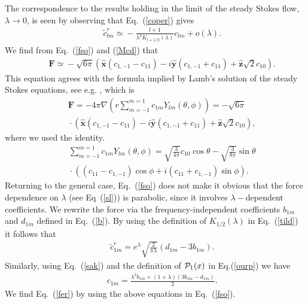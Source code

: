\documentclass[aps,prx,twocolumn,amsmath,amssymb,amsfonts]{revtex4-2}
\begin{document}
{{\begin{appendices}
The correspondence to the results holding in the limit of the steady Stokes flow, $\lambda\to 0$, is seen by observing that Eq.~(\ref{coper}) gives
\begin{eqnarray}&&
{\tilde c}^{r}_{lm} \!\simeq\!-\frac{l+1}{\lambda^2K_{l+1/2}(\lambda)}c_{lm}+o\left(\lambda\right).
\end{eqnarray}
We find from Eq.~(\ref{fso}) and (\ref{Mcd}) that
\begin{eqnarray}&&
\bm F\!\simeq \!-\sqrt{6\pi} \left(\bm{\hat x}(c_{1, -1}\!-\!c_{11})\!-\! i\bm{\hat y}(c_{1, -1}\!+\!c_{11})\!+\!\bm{\hat z}\sqrt{2}c_{10}\right).\nonumber%
\end{eqnarray}
This equation agrees with the formula implied by Lamb's solution of the steady Stokes equations, see e.g. \cite{kim,hb}, which is
\begin{eqnarray}&&\!\!\!\!\!\!\!\!\!\!\!\!
\bm F=-4\pi \nabla \left(r\sum_{m=-1}^{m=1}c_{1m}Y_{lm}(\theta, \phi)\right)=-\sqrt{6\pi} \nonumber\\&&\!\!\!\!\!\!\!\!\!\!\!\!\!
\cdot \left(\bm{\hat x}(c_{1, -1}-c_{11})\!-\! i\bm{\hat y}(c_{1, -1}+c_{11})+\bm{\hat z}\sqrt{2}c_{10}\right),
\end{eqnarray}
where we used the identity.
\begin{eqnarray}&&\!\!\!\!\!\!\!\!\!\!\!\!\!
\sum_{m=-1}^{m=1}c_{1m}Y_{lm}(\theta, \phi)=\sqrt{\frac{3}{4\pi}}c_{10}\cos\theta-\sqrt{\frac{3}{8\pi}}\sin\theta
\nonumber\\&&\!\!\!\!\!\!\!\!\!\!\!\!\!
\cdot \left((c_{11}-c_{1, -1})\cos\phi+i(c_{11}+c_{1, -1})\sin\phi\right).
\end{eqnarray}
Returning to the general case, Eq.~(\ref{fso}) does not make it obvious that the force dependence on $\lambda$ (see Eq~(\ref{sl})) is parabolic, since it involves $\lambda-$dependent coefficients. We rewrite the force via the frequency-independent coefficients $b_{1m}$ and $d_{1m}$ defined in Eq.~(\ref{b}). By using the definition of $K_{1/2}(\lambda)$ in Eq.~(\ref{tild}) it follows that
\begin{eqnarray}&&\!\!\!\!\!\!
{\tilde c}^{r}_{1m} \!= \!e^{\lambda}\sqrt{\frac{2}{\pi \lambda}}\left(d_{1m}\!-\!3b_{1m}\right). \label{rsu}
\end{eqnarray}
Similarly, using Eq.~(\ref{sak})
and the definition of $ {\cal P}_1(x)$ in Eq.(\ref{ourp}) we have
\begin{eqnarray}&&
c_{1m}\!=\!\frac{ \lambda^2 b_{1m}+(1\!+\!\lambda) \left(3b_{1m}-d_{1m}\right)}{2}.
\end{eqnarray}
We find Eq.~(\ref{fer}) by using the above equations in Eq.~(\ref{fso}).


\end{appendices}}}
\end{document}
